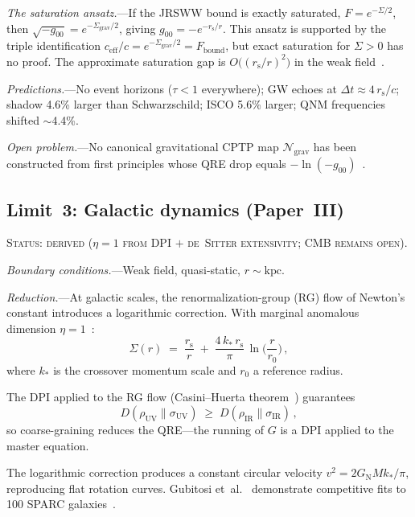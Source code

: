 \documentclass[prd,twocolumn,superscriptaddress,longbibliography,floatfix]{revtex4-2}
\newcommand{\chan}{\mathcal{N}}
\newcommand{\KL}{D}
\newcommand{\tauasym}{\tau}
\newcommand{\ceff}{c_{\mathrm{eff}}}
\newcommand{\rs}{r_{\mathrm{s}}}
\newcommand{\Sgrav}{\Sigma_{\mathrm{grav}}}
\newcommand{\Fbound}{F_{\mathrm{bound}}}
\newcommand{\GN}{G_{\mathrm{N}}}
\begin{document}
\emph{The saturation ansatz.}---If the JRSWW bound is
exactly saturated, $F = e^{-\Sigma/2}$, then
$\sqrt{-g_{00}} = e^{-\Sgrav/2}$, giving
$g_{00} = -e^{-\rs/r}$.  This ansatz is supported by
the triple identification
$\ceff/c = e^{-\Sgrav/2} = \Fbound$,
but exact saturation for $\Sigma > 0$ has no proof.
The approximate saturation gap is
$O\!\bigl((\rs/r)^2\bigr)$ in the weak
field~\cite{Paper2}.

\emph{Predictions.}---No event horizons
($\tauasym < 1$ everywhere); GW echoes at
$\Delta t \approx 4\,\rs/c$; shadow 4.6\% larger than
Schwarzschild; ISCO 5.6\% larger; QNM frequencies shifted
$\sim$4.4\%.

\emph{Open problem.}---No canonical gravitational CPTP
map $\chan_{\mathrm{grav}}$ has been constructed from
first principles whose QRE drop equals
$-\ln(-g_{00})$~\cite{Paper2}.


\subsection{Limit~3: Galactic dynamics (Paper~III)}
\label{sec:limit_galactic}

\textsc{Status: derived ($\eta = 1$ from DPI $+$ de~Sitter
extensivity; CMB remains open).}

\emph{Boundary conditions.}---Weak field, quasi-static,
$r \sim \mathrm{kpc}$.

\emph{Reduction.}---At galactic scales, the
renormalization-group (RG) flow of Newton's constant
introduces a logarithmic correction.  With marginal
anomalous dimension $\eta = 1$~\cite{Kumar2025}:
\begin{equation}
\Sigma(r) \;=\; \frac{\rs}{r}
\;+\; \frac{4\,k_*\,\rs}{\pi}\,
\ln\!\biggl(\frac{r}{r_0}\biggr)\,,
\label{eq:sigma_galactic}
\end{equation}
where $k_*$ is the crossover momentum scale and
$r_0$ a reference radius.

The DPI applied to the RG flow (Casini--Huerta
theorem~\cite{CasiniHuerta2017}) guarantees
\begin{equation}
\KL(\rho_{\mathrm{UV}}\|\sigma_{\mathrm{UV}})
\;\geq\;
\KL(\rho_{\mathrm{IR}}\|\sigma_{\mathrm{IR}})\,,
\label{eq:DPI_RG}
\end{equation}
so coarse-graining reduces the QRE---the running of $G$
is a DPI applied to the master equation.

The logarithmic correction produces a constant circular
velocity $v^2 = 2\GN M k_*/\pi$, reproducing flat
rotation curves.  Gubitosi et~al.~\cite{Gubitosi2024}
demonstrate competitive fits to 100 SPARC
galaxies~\cite{SPARC}.
\end{document}
